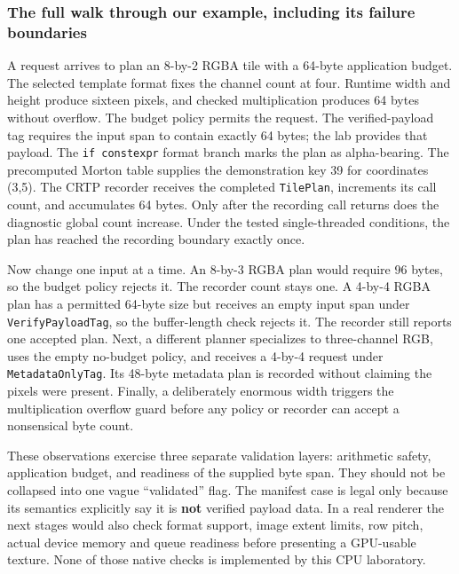 \subsubsection{The full walk through our example, including its failure boundaries}\label{the-full-walk-through-our-example-including-its-failure-boundaries}

A request arrives to plan an 8-by-2 RGBA tile with a 64-byte application budget. The selected template format fixes the channel count at four. Runtime width and height produce sixteen pixels, and checked multiplication produces 64 bytes without overflow. The budget policy permits the request. The verified-payload tag requires the input span to contain exactly 64 bytes; the lab provides that payload. The \texttt{if\ constexpr} format branch marks the plan as alpha-bearing. The precomputed Morton table supplies the demonstration key 39 for coordinates (3,5). The CRTP recorder receives the completed \texttt{TilePlan}, increments its call count, and accumulates 64 bytes. Only after the recording call returns does the diagnostic global count increase. Under the tested single-threaded conditions, the plan has reached the recording boundary exactly once.

Now change one input at a time. An 8-by-3 RGBA plan would require 96 bytes, so the budget policy rejects it. The recorder count stays one. A 4-by-4 RGBA plan has a permitted 64-byte size but receives an empty input span under \texttt{VerifyPayloadTag}, so the buffer-length check rejects it. The recorder still reports one accepted plan. Next, a different planner specializes to three-channel RGB, uses the empty no-budget policy, and receives a 4-by-4 request under \texttt{MetadataOnlyTag}. Its 48-byte metadata plan is recorded without claiming the pixels were present. Finally, a deliberately enormous width triggers the multiplication overflow guard before any policy or recorder can accept a nonsensical byte count.

These observations exercise three separate validation layers: arithmetic safety, application budget, and readiness of the supplied byte span. They should not be collapsed into one vague ``validated'' flag. The manifest case is legal only because its semantics explicitly say it is \textbf{not} verified payload data. In a real renderer the next stages would also check format support, image extent limits, row pitch, actual device memory and queue readiness before presenting a GPU-usable texture. None of those native checks is implemented by this CPU laboratory.

